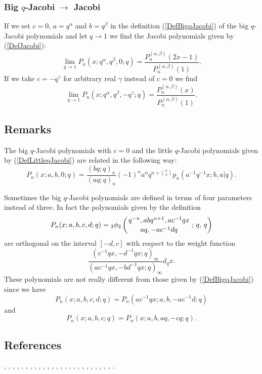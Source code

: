 \documentclass[envcountchap,graybox]{svmono}
\newcounter{rom}
\newcommand{\qhyp}[5]{\mbox{}_{#1}{\phi}_{#2}
\left(\genfrac{}{}{0pt}{}{#3}{#4}\,;\,q,\,#5\right)}
\begin{document}
\subsubsection*{Big $q$-Jacobi $\rightarrow$ Jacobi}
If we set $c=0$, $a=q^{\alpha}$ and $b=q^{\beta}$ in the definition (\ref{DefBigqJacobi})
of the big $q$-Jacobi polynomials and let $q\rightarrow 1$ we find the Jacobi
polynomials given by (\ref{DefJacobi}):
\begin{equation}
\lim_{q\rightarrow 1}P_n(x;q^{\alpha},q^{\beta},0;q)=\frac{P_n^{(\alpha,\beta)}(2x-1)}{P_n^{(\alpha,\beta)}(1)}.
\end{equation}
If we take $c=-q^{\gamma}$ for arbitrary real $\gamma$ instead of $c=0$ we
find
\begin{equation}
\lim_{q\rightarrow 1}P_n(x;q^{\alpha},q^{\beta},-q^{\gamma};q)=\frac{P_n^{(\alpha,\beta)}(x)}{P_n^{(\alpha,\beta)}(1)}.
\end{equation}

\subsection*{Remarks} 
The big $q$-Jacobi polynomials with $c=0$ and the little
$q$-Jacobi polynomials given by (\ref{DefLittleqJacobi}) are related
in the following way:
$$P_n(x;a,b,0;q)=\frac{(bq;q)_n}{(aq;q)_n}(-1)^na^nq^{n+\binom{n}{2}}p_n(a^{-1}q^{-1}x;b,a|q).$$

\noindent
Sometimes the big $q$-Jacobi polynomials are defined in terms of four
parameters instead of three. In fact the polynomials given by the definition
$$P_n(x;a,b,c,d;q)=\qhyp{3}{2}{q^{-n},abq^{n+1},ac^{-1}qx}{aq,-ac^{-1}dq}{q}$$
are orthogonal on the interval $[-d,c]$ with respect to the weight function
$$\frac{(c^{-1}qx,-d^{-1}qx;q)_{\infty}}{(ac^{-1}qx,-bd^{-1}qx;q)_{\infty}}d_qx.$$
These polynomials are not really different from those given by
(\ref{DefBigqJacobi}) since we have
$$P_n(x;a,b,c,d;q)=P_n(ac^{-1}qx;a,b,-ac^{-1}d;q)$$
and
$$P_n(x;a,b,c;q)=P_n(x;a,b,aq,-cq;q).$$

\subsection*{References}
\cite{NAlSalam89}, \cite{AlSalam90}, \cite{AndrewsAskey85}, \cite{AtakKlimyk2004},
\cite{AtakRahmanSuslov}, \cite{DattaGriffin}, \cite{FloreaniniVinetII},
\cite{GasperRahman90}, \cite{GrunbaumHaine96}, \cite{Gupta92}, \cite{Hahn},
\cite{Ismail86I}, \cite{IsmailStanton97}, \cite{IsmailWilson}, \cite{KalninsMiller88},
\cite{KoelinkE}, \cite{Koorn90II}, \cite{Koorn93}, \cite{Koorn2007}, \cite{Miller89},
\cite{Nikiforov+}, \cite{NoumiMimachi90II}, \cite{NoumiMimachi90III},
\cite{NoumiMimachi91}, \cite{Spiridonov97}, \cite{SrivastavaJain90}.
\end{document}
